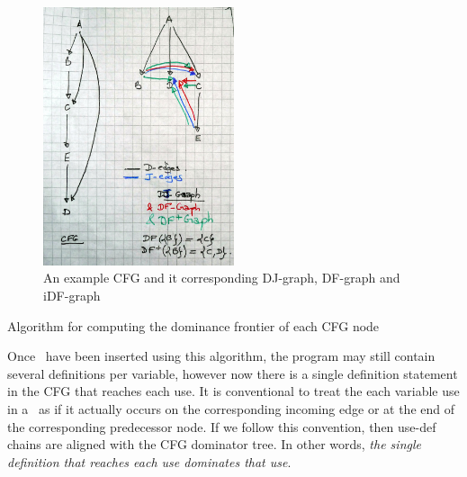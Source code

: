 \begin{figure}
\includegraphics[width=0.5\textwidth]{iDF.jpeg}
\caption{\label{fig:classical_construction_algorithm:iDF}An example CFG and it corresponding DJ-graph, DF-graph and iDF-graph}
\end{figure}

\begin{algorithm}
\caption{\label{alg:classical_construction:df}Algorithm for computing the dominance frontier of each CFG node}
\end{algorithm}



Once \phiops\ have been inserted using this algorithm, the program may
still contain several definitions per variable, however now there is a
single definition statement 
in the CFG that reaches each use. 
It is conventional to treat the each variable use in a \phiop\
as if it actually occurs on the corresponding incoming edge or at the end of the
corresponding predecessor node.
If we follow this convention,  
then use-def chains are aligned with the CFG dominator tree.
In other words,
\emph{the single definition that reaches each use dominates that use}.

